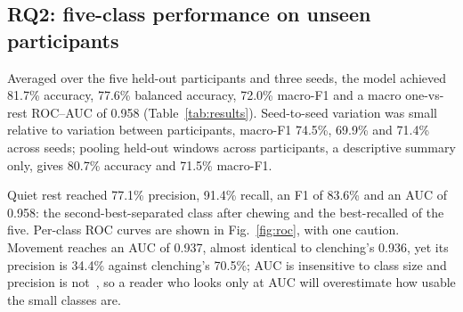 \documentclass[pdflatex,sn-nature,iicol]{sn-jnl}
\begin{document}
\subsection{RQ2: five-class performance on unseen participants}

Averaged over the five held-out participants and three seeds, the model achieved 81.7\% accuracy, 77.6\% balanced accuracy, 72.0\% macro-F1 and a macro one-vs-rest ROC--AUC of 0.958 (Table~\ref{tab:results}). Seed-to-seed variation was small relative to variation between participants, macro-F1 74.5\%, 69.9\% and 71.4\% across seeds; pooling held-out windows across participants, a descriptive summary only, gives 80.7\% accuracy and 71.5\% macro-F1.

Quiet rest reached 77.1\% precision, 91.4\% recall, an F1 of 83.6\% and an AUC of 0.958: the second-best-separated class after chewing and the best-recalled of the five. Per-class ROC curves are shown in Fig.~\ref{fig:roc}, with one caution. Movement reaches an AUC of 0.937, almost identical to clenching's 0.936, yet its precision is 34.4\% against clenching's 70.5\%; AUC is insensitive to class size and precision is not~\cite{saito2015precision,davis2006relationship}, so a reader who looks only at AUC will overestimate how usable the small classes are.
\end{document}
